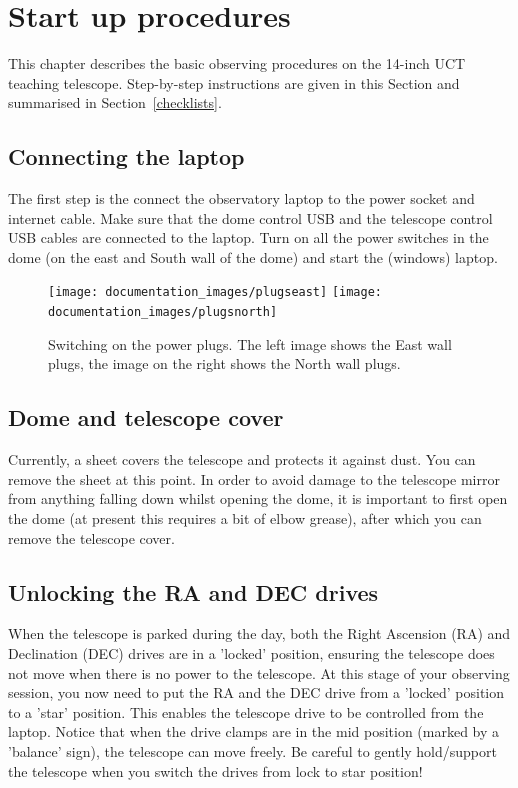 \documentclass[12pt,twoside,a4paper]{report}
\begin{document}
\section{Start up procedures}

This chapter describes the basic observing procedures on the 14-inch UCT teaching telescope. 
Step-by-step instructions are given in this Section and
summarised in Section~\ref{checklists}.

\subsection{Connecting the laptop}

The first step is the connect the observatory laptop to the power socket and internet cable. Make
sure that the dome control USB and the telescope control USB cables are connected to the laptop.
Turn on all the power switches in the dome (on the east and South wall of the dome) and start the
(windows) laptop.

\begin{figure}[h]
 \centering
    \texttt{[image: documentation\_images/plugseast]}
    \texttt{[image: documentation\_images/plugsnorth]}
    \caption{\label{fig:plugs} Switching on the power plugs. The left image shows the East wall plugs, the
image on the right shows the North wall plugs.}
\end{figure}


\subsection{Dome and telescope cover}

Currently, a sheet covers the telescope and protects it against dust. You can remove the sheet at this point.
In order to avoid damage to the telescope mirror from anything falling down whilst opening the dome, 
it is important to first open the dome (at present this requires a bit of elbow grease), after which 
you can remove the telescope cover. 

\subsection{Unlocking the RA and DEC drives}

When the telescope is parked during the day, both the Right Ascension (RA) and Declination (DEC) drives are 
in a 'locked' position, ensuring the telescope does not move when there is no power to the telescope.
At this stage of your observing session, you now need to put the RA and the DEC drive from a 'locked' position
to a 'star' position. This enables the telescope drive to be controlled from the laptop. 
Notice that when the drive clamps are in the mid position (marked by a 'balance' sign), the telescope 
can move freely. Be careful to gently hold/support the telescope when you switch the drives from 
lock to star position!
\end{document}

